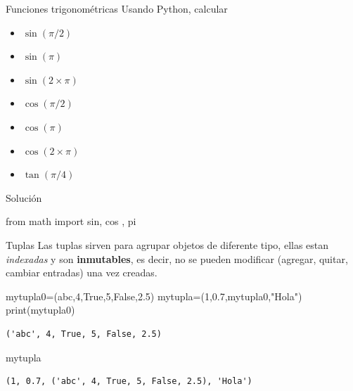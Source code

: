 \documentclass[
  ignorenonframetext,
  aspectratio=169,
  spanish,
]{beamer}
\newenvironment{Shaded}{\begin{snugshade}}{\end{snugshade}}
\newcommand{\BuiltInTok}[1]{\textcolor[rgb]{0.00,0.23,0.31}{#1}}
\newcommand{\DecValTok}[1]{\textcolor[rgb]{0.68,0.00,0.00}{#1}}
\newcommand{\FloatTok}[1]{\textcolor[rgb]{0.68,0.00,0.00}{#1}}
\newcommand{\ImportTok}[1]{\textcolor[rgb]{0.00,0.46,0.62}{#1}}
\newcommand{\NormalTok}[1]{\textcolor[rgb]{0.00,0.23,0.31}{#1}}
\newcommand{\OperatorTok}[1]{\textcolor[rgb]{0.37,0.37,0.37}{#1}}
\newcommand{\StringTok}[1]{\textcolor[rgb]{0.13,0.47,0.30}{#1}}
\newcommand{\VariableTok}[1]{\textcolor[rgb]{0.07,0.07,0.07}{#1}}
\providecommand{\tightlist}{%
  \setlength{\itemsep}{0pt}\setlength{\parskip}{0pt}}
\begin{document}
\begin{frame}{Funciones trigonométricas}
\label{funciones-trigonomuxe9tricas}
Usando Python, calcular

\begin{itemize}
\tightlist
\item
  \(\sin(\pi/2)\)
\item
  \(\sin(\pi)\)
\item
  \(\sin(2\times \pi)\)
\item
  \(\cos(\pi/2)\)
\item
  \(\cos(\pi)\)
\item
  \(\cos(2\times \pi)\)
\item
  \(\tan(\pi/4)\)
\end{itemize}
\end{frame}

\begin{frame}[fragile]{Solución}
\label{soluciuxf3n}
\begin{Shaded}
\begin{Highlighting}[]
\ImportTok{from}\NormalTok{ math }\ImportTok{import}\NormalTok{ sin, cos , pi }
\end{Highlighting}
\end{Shaded}
\end{frame}

\begin{frame}[fragile]{Tuplas}
\label{tuplas}
Las tuplas sirven para agrupar objetos de diferente tipo, ellas estan
\emph{indexadas} y son \textbf{inmutables}, es decir, no se pueden
modificar (agregar, quitar, cambiar entradas) una vez creadas.

\begin{Shaded}
\begin{Highlighting}[]
\NormalTok{mytupla0}\OperatorTok{=}\NormalTok{(}\StringTok{\textquotesingle{}abc\textquotesingle{}}\NormalTok{,}\DecValTok{4}\NormalTok{,}\VariableTok{True}\NormalTok{,}\DecValTok{5}\NormalTok{,}\VariableTok{False}\NormalTok{,}\FloatTok{2.5}\NormalTok{)}
\NormalTok{mytupla}\OperatorTok{=}\NormalTok{(}\DecValTok{1}\NormalTok{,}\FloatTok{0.7}\NormalTok{,mytupla0,}\StringTok{"Hola"}\NormalTok{) }
\BuiltInTok{print}\NormalTok{(mytupla0)}
\end{Highlighting}
\end{Shaded}

\begin{verbatim}
('abc', 4, True, 5, False, 2.5)
\end{verbatim}

\begin{Shaded}
\begin{Highlighting}[]
\NormalTok{mytupla}
\end{Highlighting}
\end{Shaded}

\begin{verbatim}
(1, 0.7, ('abc', 4, True, 5, False, 2.5), 'Hola')
\end{verbatim}
\end{frame}
\end{document}
